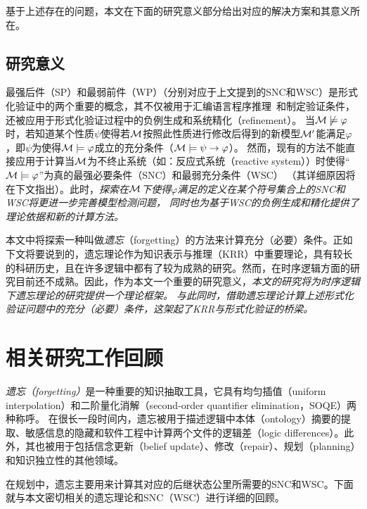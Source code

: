 基于上述存在的问题，本文在下面的研究意义部分给出对应的解决方案和其意义所在。

\subsection{研究意义}
最强后件（SP）和最弱前件（WP）（分别对应于上文提到的SNC和WSC）是形式化验证中的两个重要的概念，其不仅被用于汇编语言程序推理~\cite{legato2002weakest}和制定验证条件\cite{DBLP:journals/ipl/Leino05}，还被应用于形式化验证过程中的负例生成\cite{dailler2018instrumenting}和系统精化（refinement）\cite{woodcock1990refinement}。
当${\cal M}\not \models \varphi$时，若知道某个性质$\psi$使得若${\cal M}$按照此性质进行修改后得到的新模型${\cal M}'$能满足$\varphi$，即$\psi$为使得${\cal M}\models \varphi$成立的充分条件（${\cal M} \models \psi\rightarrow \varphi$）。
然而，现有的方法不能直接应用于计算当${\cal M}$为不终止系统（如：反应式系统（reactive system））时使得“${\cal M}\models \varphi$”为真的最强必要条件（SNC）和最弱充分条件（WSC）
（其详细原因将在下文指出）。此时，\emph{探索在${\cal M}$下使得$\varphi$满足的定义在某个符号集合上的SNC和WSC将更进一步完善模型检测问题，
同时也为基于WSC的负例生成和精化提供了理论依据和新的计算方法。}

本文中将探索一种叫做\emph{遗忘}（forgetting）的方法来计算充分（必要）条件。正如下文将要说到的，遗忘理论作为知识表示与推理（KRR）中重要理论，具有较长的科研历史，且在许多逻辑中都有了较为成熟的研究。然而，在时序逻辑方面的研究目前还不成熟。因此，作为本文一个重要的研究意义，\emph{本文的研究将为时序逻辑下遗忘理论的研究提供一个理论框架。
与此同时，借助遗忘理论计算上述形式化验证问题中的充分（必要）条件，这架起了KRR与形式化验证的桥梁。}

\section{相关研究工作回顾}

\emph{遗忘（forgetting）}是一种重要的知识抽取工具，它具有均匀插值（uniform interpolation）和二阶量化消解（second-order quantifier elimination，SOQE）两种称呼。
在很长一段时间内，遗忘被用于描述逻辑中本体（ontology）摘要的提取、敏感信息的隐藏和软件工程中计算两个文件的逻辑差（logic differences）。此外，其也被用于包括信念更新（belief update）、修改（repair）、规划（planning）和知识独立性的其他领域。

在规划中，遗忘主要用来计算其对应的后继状态公里所需要的SNC和WSC。下面就与本文密切相关的遗忘理论和SNC（WSC）进行详细的回顾。






